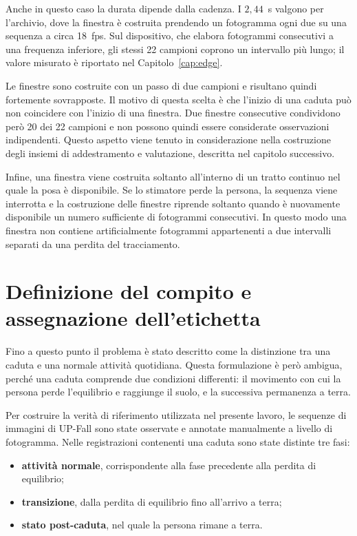 Anche in questo caso la durata dipende dalla cadenza. I $2{,}44$~s valgono per l'archivio, dove la finestra è costruita prendendo un fotogramma ogni due su una sequenza a circa 18~fps. Sul dispositivo, che elabora fotogrammi consecutivi a una frequenza inferiore, gli stessi 22 campioni coprono un intervallo più lungo; il valore misurato è riportato nel Capitolo~\ref{cap:edge}.

Le finestre sono costruite con un passo di due campioni e risultano quindi fortemente sovrapposte. Il motivo di questa scelta è che l'inizio di una caduta può non coincidere con l'inizio di una finestra. Due finestre consecutive condividono però 20 dei 22 campioni e non possono quindi essere considerate osservazioni indipendenti. Questo aspetto viene tenuto in considerazione nella costruzione degli insiemi di addestramento e valutazione, descritta nel capitolo successivo.

Infine, una finestra viene costruita soltanto all'interno di un tratto continuo nel quale la posa è disponibile. Se lo stimatore perde la persona, la sequenza viene interrotta e la costruzione delle finestre riprende soltanto quando è nuovamente disponibile un numero sufficiente di fotogrammi consecutivi. In questo modo una finestra non contiene artificialmente fotogrammi appartenenti a due intervalli separati da una perdita del tracciamento.

\section{Definizione del compito e assegnazione dell'etichetta}
\label{sec:compito}

Fino a questo punto il problema è stato descritto come la distinzione tra una caduta e una normale attività quotidiana. Questa formulazione è però ambigua, perché una caduta comprende due condizioni differenti: il movimento con cui la persona perde l'equilibrio e raggiunge il suolo, e la successiva permanenza a terra.

Per costruire la verità di riferimento utilizzata nel presente lavoro, le sequenze di immagini di UP-Fall sono state osservate e annotate manualmente a livello di fotogramma. Nelle registrazioni contenenti una caduta sono state distinte tre fasi:
\begin{itemize}
    \item \textbf{attività normale}, corrispondente alla fase precedente alla perdita di equilibrio;
    \item \textbf{transizione}, dalla perdita di equilibrio fino all'arrivo a terra;
    \item \textbf{stato post-caduta}, nel quale la persona rimane a terra.
\end{itemize}

